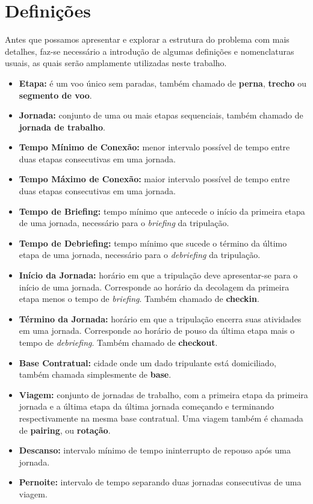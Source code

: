 
\section{Definições}
\label{sec:definicoes}

Antes que possamos apresentar e explorar a estrutura do problema com mais detalhes, faz-se
necessário a introdução de algumas definições e nomenclaturas usuais, as quais serão amplamente
utilizadas neste trabalho.

\begin{itemize}
	\item {\bf Etapa:} é um voo único sem paradas, também chamado de {\bf perna}, {\bf trecho} ou 
	{\bf segmento de voo}.
	\item {\bf Jornada:} conjunto de uma ou mais etapas sequenciais, também chamado de {\bf jornada 
	de trabalho}. 
	\item {\bf Tempo Mínimo de Conexão:} menor intervalo possível de tempo entre duas etapas 
	consecutivas em uma jornada.
	\item {\bf Tempo Máximo de Conexão:} maior intervalo possível de tempo entre duas etapas 
	consecutivas em uma jornada.
	\item {\bf Tempo de Briefing:} tempo mínimo que antecede o início da primeira etapa de uma
	jornada, necessário para o {\it briefing} da tripulação.
	\item {\bf Tempo de Debriefing:} tempo mínimo que sucede o término da último etapa de uma
	jornada, necessário para o {\it debriefing} da tripulação.
	\item {\bf Início da Jornada:} horário em que a tripulação deve apresentar-se para o início
	de uma jornada. Corresponde ao horário da decolagem da primeira etapa menos o tempo de 
	{\it briefing}. 
	Também chamado de {\bf checkin}.
	\item {\bf Término da Jornada:} horário em que a tripulação encerra suas atividades em uma 
	jornada. Corresponde ao horário de pouso da última etapa mais o tempo de {\it debriefing}.
	Também chamado de {\bf checkout}.
	\item {\bf Base Contratual:} cidade onde um dado tripulante está domiciliado, também
	chamada simplesmente de {\bf base}.
	\item {\bf Viagem:} conjunto de jornadas de trabalho, com a primeira etapa da primeira
	jornada e a última etapa da última jornada começando e terminando respectivamente na mesma
	base contratual. Uma viagem também é chamada de {\bf pairing}, ou {\bf rotação}.
	\item {\bf Descanso:} intervalo mínimo de tempo ininterrupto de repouso após uma jornada.
	\item {\bf Pernoite:} intervalo de tempo separando duas jornadas consecutivas de uma viagem.
\end{itemize}

